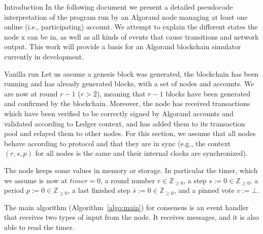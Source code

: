 \documentclass[10pt,a4paper]{article}
\begin{document}
\begin{section}{Introduction}
In the following document we present a detailed pseudocode interpretation 
of the program run by an Algorand node managing at least one online (i.e., 
participating) account. We attempt to explain the different states the node x
can be in, as well as all kinds of events that cause transitions and network 
output. This work will provide a basis for an Algorand blockchain simulator 
currently in development.

\begin{subsection}{Vanilla run}\label{subsect:vanilla-run}
Let us assume a genesis block was generated, the blockchain has been running and
has already generated blocks, with a set of nodes and accounts. 
We are now at round $r-1$ ($r>2$), meaning that $r-1$ blocks have been 
generated and confirmed by the blockchain.
Moreover, the node has received transactions which have been verified to 
be correctly signed by Algorand accounts and validated according to Ledger context, 
and has added them to its transaction pool and relayed them to other nodes.
For this section, we assume that all nodes behave according to protocol
and that they are in sync (e.g., the context $(r,s,p)$ for all nodes is 
the same and their internal clocks are synchronized).

The node keeps some values in memory or storage. In particular the 
timer, which we assume is now at $timer=0$,
a round number $r\in\mathbb{Z}_{\ge 0}$, 
a step $s:=0\in\mathbb{Z}_{\ge 0}$,
a period $p:=0\in\mathbb{Z}_{\ge 0}$, 
a last finished step $\bar{s}:=0\in\mathbb{Z}_{\ge 0}$, and 
a pinned vote $v:=\bot$.

The main algorithm (Algorithm~\ref{algo:main}) for consensus is an event 
handler that receives two types of input from the node. 
It receives messages, and it is also able to read the timer.
%


\end{subsection}
\end{section}
\end{document}
